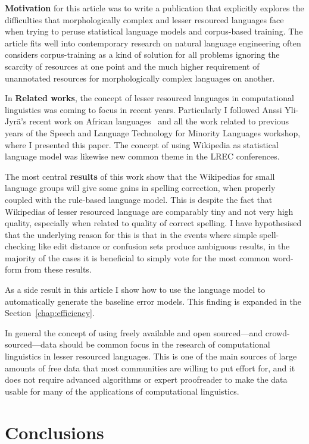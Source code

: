 \documentclass[officiallayout]{unihelcompling}
\begin{document}
\textbf{Motivation} for this article was to write a publication that explicitly
explores the difficulties that morphologically complex and lesser resourced
languages face when trying to peruse statistical language models and
corpus-based training. The article fits well into contemporary research on
natural language engineering often considers corpus-training as a kind of
solution for all problems ignoring the scarcity of resources at one point and
the much higher requirement of unannotated resources for morphologically
complex languages on another.

In \textbf{Related works}, the concept of lesser resourced languages in
computational linguistics was coming to focus in recent years. Particularly I
followed Anssi Yli-Jyrä's recent work on African
languages~\citep{yli2005toward} and all the work related to previous years of
the Speech and Language Technology for Minority Languages workshop, where I
presented this paper.  The concept of using Wikipedia as statistical language
model was likewise new common theme in the LREC conferences.

The most central \textbf{results} of this work show that the Wikipedias for
small language groups will give some gains in spelling correction, when
properly coupled with the rule-based language model. This is despite the fact
that Wikipedias of lesser resourced language are comparably tiny and not very
high quality, especially when related to quality of correct spelling.  I have
hypothesised that the underlying reason for this is that in the events where
simple spell-checking like edit distance or confusion sets produce ambiguous
results, in the majority of the cases it is beneficial to simply vote for the
most common word-form from these results.

As a side result in this article I show how to use the language model to
automatically generate the baseline error models. This finding is expanded in
the Section~\ref{chap:efficiency}.

In general the concept of using freely available and open sourced---and
crowd-sourced---data should be common focus in the research of computational
linguistics in lesser resourced languages. This is one of the main sources of
large amounts of free data that most communities are willing to put effort for,
and it does not require advanced algorithms or expert proofreader to make the
data usable for many of the applications of computational linguistics.

\section{Conclusions}
\end{document}

